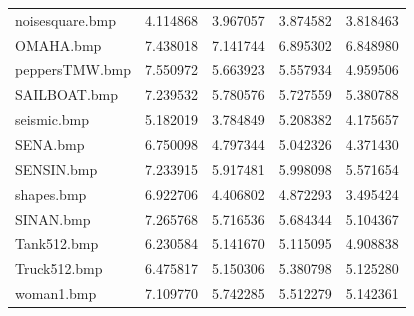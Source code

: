 \documentclass{article}
\begin{document}
\begin{table}[H]
\begin{adjustbox}{center}
\begin{tabular}{lrrrr}
    noisesquare.bmp    & 4.114868                     & 3.967057                               & 3.874582                                  & 3.818463                                   \\
    OMAHA.bmp          & 7.438018                     & 7.141744                               & 6.895302                                  & 6.848980                                   \\
    peppersTMW.bmp     & 7.550972                     & 5.663923                               & 5.557934                                  & 4.959506                                   \\
    SAILBOAT.bmp       & 7.239532                     & 5.780576                               & 5.727559                                  & 5.380788                                   \\
    seismic.bmp        & 5.182019                     & 3.784849                               & 5.208382                                  & 4.175657                                   \\
    SENA.bmp           & 6.750098                     & 4.797344                               & 5.042326                                  & 4.371430                                   \\
    SENSIN.bmp         & 7.233915                     & 5.917481                               & 5.998098                                  & 5.571654                                   \\
    shapes.bmp         & 6.922706                     & 4.406802                               & 4.872293                                  & 3.495424                                   \\
    SINAN.bmp          & 7.265768                     & 5.716536                               & 5.684344                                  & 5.104367                                   \\
    Tank512.bmp        & 6.230584                     & 5.141670                               & 5.115095                                  & 4.908838                                   \\
    Truck512.bmp       & 6.475817                     & 5.150306                               & 5.380798                                  & 5.125280                                   \\
    woman1.bmp         & 7.109770                     & 5.742285                               & 5.512279                                  & 5.142361                                   \\

\end{tabular}
\end{adjustbox}
\end{table}
\end{document}
